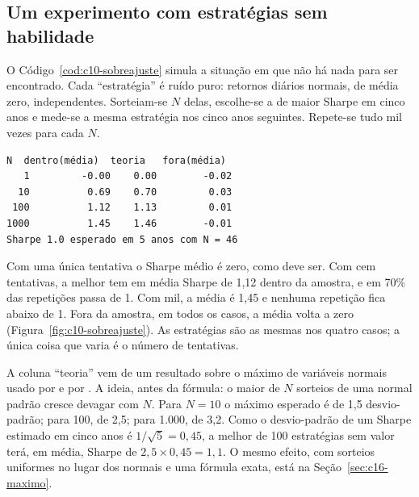 \subsection{Um experimento com estratégias sem habilidade}

O Código~\ref{cod:c10-sobreajuste} simula a situação em que não há nada para ser encontrado. Cada ``estratégia'' é ruído puro: retornos diários normais, de média zero, independentes. Sorteiam-se $N$ delas, escolhe-se a de maior Sharpe em cinco anos e mede-se a mesma estratégia nos cinco anos seguintes. Repete-se tudo mil vezes para cada $N$.


\begin{lstlisting}[style=saida]
   N  dentro(média)  teoria   fora(média)
   1         -0.00    0.00        -0.02
  10          0.69    0.70         0.03
 100          1.12    1.13         0.01
1000          1.45    1.46        -0.01
Sharpe 1.0 esperado em 5 anos com N = 46
\end{lstlisting}

Com uma única tentativa o Sharpe médio é zero, como deve ser. Com cem tentativas, a melhor tem em média Sharpe de 1,12 dentro da amostra, e em 70\% das repetições passa de 1. Com mil, a média é 1,45 e nenhuma repetição fica abaixo de 1. Fora da amostra, em todos os casos, a média volta a zero (Figura~\ref{fig:c10-sobreajuste}). As estratégias são as mesmas nos quatro casos; a única coisa que varia é o número de tentativas.


A coluna ``teoria'' vem de um resultado sobre o máximo de variáveis normais usado por \citet{bailey2014pseudo} e por \citet{bailey2014dsr}. A ideia, antes da fórmula: o maior de $N$ sorteios de uma normal padrão cresce devagar com $N$. Para $N = 10$ o máximo esperado é de 1,5 desvio-padrão; para 100, de 2,5; para 1.000, de 3,2. Como o desvio-padrão de um Sharpe estimado em cinco anos é $1/\sqrt{5} = 0,45$, a melhor de 100 estratégias sem valor terá, em média, Sharpe de $2,5 \times 0,45 = 1,1$. O mesmo efeito, com sorteios uniformes no lugar dos normais e uma fórmula exata, está na Seção~\ref{sec:c16-maximo}.

